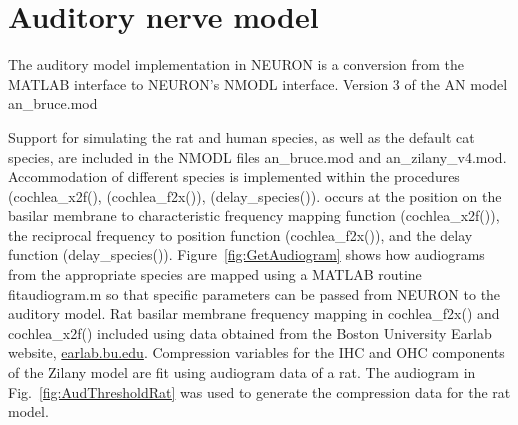 \section{Auditory nerve model}

The auditory model implementation in NEURON is a conversion from the MATLAB
interface to NEURON's NMODL interface. Version 3 of the AN model
\mbox{\textsf{an\_bruce.mod}}

Support for simulating the rat and human species, as well as the default cat
species, are included in the NMODL files \mbox{\textsf{an\_bruce.mod}} and
\mbox{\textsf{an\_zilany\_v4.mod}}.  Accommodation of different species is
implemented within the procedures (\mbox{\textsf{cochlea\_x2f()}},
(\mbox{\textsf{cochlea\_f2x()}}), (\mbox{\textsf{delay\_species()}}). occurs at
the position on the basilar membrane to characteristic frequency mapping
function (\mbox{\textsf{cochlea\_x2f()}}), the reciprocal frequency to position
function (\mbox{\textsf{cochlea\_f2x()}}), and the delay function
(\mbox{\textsf{delay\_species()}}).  Figure~\ref{fig:GetAudiogram} shows how
audiograms from the appropriate species are mapped using a MATLAB routine
\mbox{\textsf{fitaudiogram.m}} so that specific parameters can be passed from
NEURON to the auditory model.  Rat basilar membrane frequency mapping in
\mbox{\textsf{cochlea\_f2x()}} and \mbox{\textsf{cochlea\_x2f()}} included using
data obtained from the Boston University Earlab website, \url{earlab.bu.edu}.
Compression variables for the IHC and OHC components of the Zilany model are fit
using audiogram data of a rat.  The audiogram in Fig.~\ref{fig:AudThresholdRat}
was used to generate the compression data for the rat model.

\medskip{}




